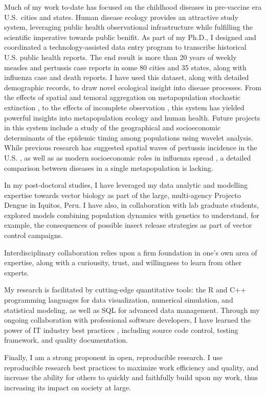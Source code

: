 \documentclass[12pt]{article}
\begin{document}
Much of my work to-date has focused on the childhood diseases 
in pre-vaccine era U.S.\ cities and 
states.  Human disease ecology provides an 
attractive study system, 
leveraging public health observational 
infrastructure while 
fulfilling the scientific imperative towards public benifit.
As part of my Ph.D., I designed and coordinated a technology-assisted
data entry program to transcribe historical U.S. 
public health reports. The end result is more than 
20 years of weekly measles and
pertussis case reports in some 80 cities and 35 
states, along with influenza case and death reports.
I have used this dataset, along with detailed demographic records, to draw novel ecological insight into 
disease processes. From the 
effects of spatial and temoral aggregation on metapopulation stochastic
extinction \citep{gunning2013probabilistic}, to the 
effects of incomplete
observation \citep{gunning2014conserved}, this system
has yielded powerful insights into metapopulation 
ecology and human health.
Future projects in this system include a study of 
the geographical and socioeconomic determinants of 
the epidemic timing among populations 
using wavelet analysis.  While previous research has 
suggested spatial waves of pertussis incidence 
in the U.S. \citep{choisy2012changing}, as well as 
as modern socioeconomic roles in influenza spread \citep{viboud2006synchrony}, a detailed
comparison between diseases in a single 
metapopulation is lacking.

In my post-doctoral studies, I have leveraged my 
data analytic and modelling expertise towards
vector biology as part of the large, multi-agency
Projecto Dengue in Iquitos, Peru. 
I have also, in collaboration with lab graduate
students, explored models
combining population dynamics with genetics to 
understand, for example, the consequences of 
possible insect release strategies as part of 
vector control campaigns.  





Interdisciplinary collaboration relies upon a firm
foundation in one's own area of expertise, along
with a curiousity, trust, and willingness to learn
from other experts.

My research is facilitated by cutting-edge quantitative tools:
the R and C++ programming languages for data visualization,
numerical simulation, and statistical modeling, as well as SQL for 
advanced data management. Through my ongoing 
collaboration with professional software developers,
I have learned the power of IT industry best 
practices \citep{}, including source code control,
testing framework, and quality documentation.

Finally, I am a strong proponent in open, 
reproducible research. 
I use reproducible research best practices 
to maximize work efficiency and quality, and increase
the ability for others to quickly and faithfully 
build upon my work, thus increasing its impact
on society at large.
\end{document}
